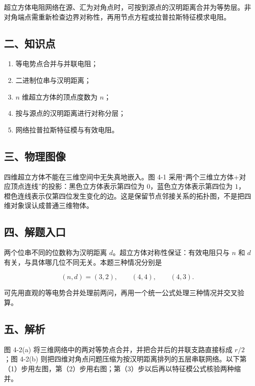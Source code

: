 \documentclass[12pt,a4paper,UTF8]{ctexart}
\newcommand{\tightlist}{\setlength{\itemsep}{0pt}\setlength{\parskip}{0pt}}
\begin{document}
超立方体电阻网络在源、汇为对角点时，可按到源点的汉明距离合并为等势层。非对角端点需重新检查边界对称性，再用节点方程或拉普拉斯特征模求电阻。

\subsection{二、知识点}\label{ux4e8cux77e5ux8bc6ux70b9-3}

\begin{enumerate}
\def\labelenumi{\arabic{enumi}.}
\tightlist
\item
  等电势点合并与并联电阻；
\item
  二进制位串与汉明距离；
\item
  \(n\) 维超立方体的顶点度数为 \(n\)；
\item
  按与源点的汉明距离进行对称分层；
\item
  网络拉普拉斯特征模与有效电阻。
\end{enumerate}

\subsection{三、物理图像}\label{ux4e09ux7269ux7406ux56feux50cf-3}

四维超立方体不能在三维空间中无失真地嵌入。图 4-1
采用``两个三维立方体+对应顶点连线''的投影：黑色立方体表示第四位为
\(0\)，蓝色立方体表示第四位为
\(1\)，橙色连线表示仅第四位发生变化的边。这是保留节点邻接关系的拓扑图，不是把四维对象误认成普通三维物体。

\subsection{四、解题入口}\label{ux56dbux89e3ux9898ux5165ux53e3-3}

两个位串不同的位数称为汉明距离 \(d\)。超立方体对称性保证：有效电阻只与
\(n\) 和 \(d\) 有关，与具体哪几位不同无关。本题三种情况分别是

\[
(n,d)=(3,2),\qquad(4,4),\qquad(4,3).
\]

可先用直观的等电势合并处理前两问，再用一个统一公式处理三种情况并交叉验算。

\subsection{五、解析}\label{ux4e94ux89e3ux6790-3}

图 4-2(a) 将三维网络中的两对等势点合并，并把合并后的并联支路直接标成
\(r/2\)；图 4-2(b)
则把四维对角点问题压缩为按汉明距离排列的五层串联网络。以下第（1）步用左图，第（2）步用右图；第（3）步以后再以特征模公式核验两种缩并。
\end{document}
